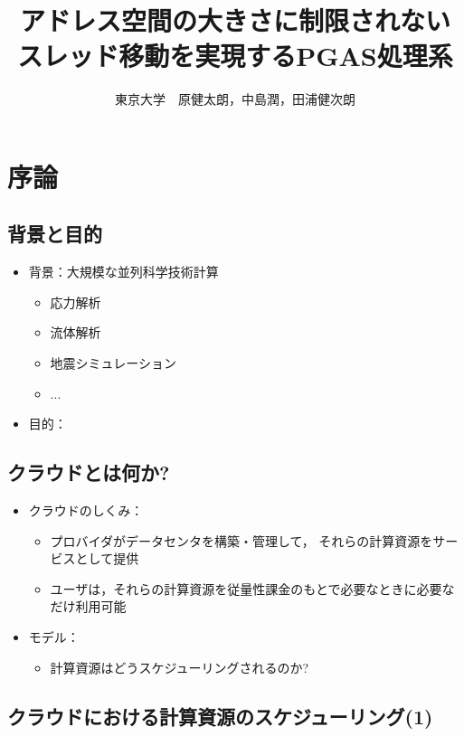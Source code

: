 \documentclass[25pt,papersize,landscape]{jsarticle}
\title{アドレス空間の大きさに制限されない\\スレッド移動を実現するPGAS処理系}
\author{東京大学　原健太朗，中島潤，田浦健次朗}
\date{\mytoday}
\begin{document}
\maketitle

\section{序論}

\subsection{背景と目的}

\begin{itemize}
\item 背景：大規模な並列科学技術計算
  \begin{itemize}
  \item 応力解析
  \item 流体解析
  \item 地震シミュレーション
  \item ...
  \end{itemize}
\item 目的：
\end{itemize}

\subsection{クラウドとは何か?}

\begin{itemize}
\item クラウドのしくみ：
  \begin{itemize}
  \item プロバイダがデータセンタを構築・管理して，
    それらの計算資源をサービスとして提供
  \item ユーザは，それらの計算資源を従量性課金のもとで必要なときに必要なだけ利用可能
  \end{itemize}
\item モデル：
  \begin{itemize}
  \item 計算資源はどうスケジューリングされるのか?
  \end{itemize}
\end{itemize}

\subsection{クラウドにおける計算資源のスケジューリング(1)}
\end{document}
